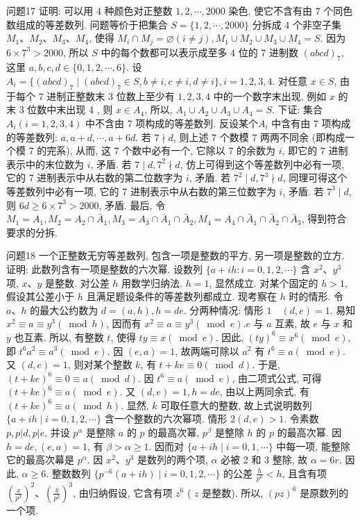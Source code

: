 问题17 证明: 可以用 4 种颜色对正整数 $1,2, \cdots, 2000$ 染色, 使它不含有由 7 个同色数组成的等差数列.
问题等价于把集合 $S=\{1,2, \cdots, 2000\}$ 分拆成 4 个非空子集 $M_1 、 M_2 、 M_3 、 M_4$, 使得 $M_i \cap M_j=\varnothing(i \neq j), M_1 \cup M_2 \cup M_3 \cup M_4=S$.
因为 $6 \times 7^3>2000$, 所以 $S$ 中的每个数都可以表示成至多 4 位的 7 进制数 $(a b c d)_7$, 这里 $a, b, c, d \in\{0,1,2, \cdots, 6\}$. 设 $A_i= \{(a b c d)_7 \mid(a b c d)_7 \in S, b \neq i, c \neq i, d \neq i\}, i=1,2,3,4$. 对任意 $x \in S$, 由于每个 7 进制正整数末 3 位数上至少有 $1,2,3,4$ 中的一个数字末出现, 例如 $x$ 的末 3 位数中末出现 4 , 则 $x \in A_4$, 所以, $A_1 \cup A_2 \cup A_3 \cup A_4=S$.
下证: 集合 $A_i(i=1,2,3,4)$ 中不含由 7 项构成的等差数列.
反设某个$A_i$ 中含有由 7 项构成的等差数列: $a, a+d, \cdots, a+6 d$. 若 $7 \nmid d$, 则上述 7 个数模 7 两两不同余 (即构成一个模 7 的完系), 从而, 这 7 个数中必有一个, 它除以 7 的余数为 $i$, 即它的 7 进制表示中的末位数为 $i$, 矛盾.
若 $7 \mid d, 7^2 \nmid d$, 仿上可得到这个等差数列中必有一项, 它的 7 进制表示中从右数的第二位数字为 $i$, 矛盾.
若 $7^2 \mid d, 7^3 \nmid d$, 同理可得这个等差数列中必有一项, 它的 7 进制表示中从右数的第三位数字为 $i$, 矛盾.
若 $7^3 \mid d$, 则 $6 d \geqslant 6 \times 7^3>2000$, 矛盾.
最后, 令 $M_1=A_1, M_2=A_2 \cap \bar{A}_1, M_3=A_3 \cap \bar{A}_1 \cap \bar{A}_2, M_4=A_4 \cap \bar{A}_1 \cap \bar{A}_2 \cap \bar{A}_3$, 得到符合要求的分拆.



问题18 一个正整数无穷等差数列, 包含一项是整数的平方, 另一项是整数的立方.
证明: 此数列含有一项是整数的六次幂.
设数列 $\{a+i h: i=0,1,2, \cdots\}$ 含 $x^2 、 y^3$ 项, $x 、 y$ 是整数.
对公差 $h$ 用数学归纳法.
$h=1$, 显然成立.
对某个固定的 $h>1$, 假设其公差小于 $h$ 且满足题设条件的等差数列都成立.
现考察在 $h$ 时的情形.
令 $a 、 h$ 的最大公约数为 $d=(a, h), h=d e$. 分两种情况:
情形 $1 \quad(d, e)=1$. 易知 $x^2 \equiv a \equiv y^3(\bmod h)$, 因而有 $x^2 \equiv a \equiv y^3(\bmod e) . e$ 与 $a$ 互素, 故 $e$ 与 $x$ 和 $y$ 也互素.
所以, 有整数 $t$, 使得 $t y \equiv x(\bmod e)$. 因此, $(t y)^6 \equiv x^6(\bmod e)$, 即 $t^6 a^2 \equiv a^3(\bmod e)$. 因 $(e, a)=1$, 故两端可除以 $a^2$ 有 $t^6 \equiv a(\bmod e)$. 又 $(d, e)=1$, 则对某个整数 $k$, 有 $t+k e \equiv 0(\bmod d)$. 于是, $(t+k e)^6 \equiv 0 \equiv a(\bmod d)$. 因 $t^6 \equiv a(\bmod e)$, 由二项式公式, 可得 $(t+k e)^6 \equiv a(\bmod e)$. 又 $(d, e)=1, h=d e$, 由以上两同余式, 有 $(t+k e)^6 \equiv a (\bmod h)$. 显然, $k$ 可取任意大的整数, 故上式说明数列 $\{a+i h \mid i=0,1,2, \cdots\}$ 含一个整数的六次幂项.
情形 $2(d, e)>1$. 令素数 $p, p|d, p| e$, 并设 $p^\alpha$ 是整除 $a$ 的 $p$ 的最高次幂, $p^\beta$ 是整除 $h$ 的 $p$ 的最高次幂.
因 $h=d e,(e, a)=1$, 有 $\beta>\alpha \geqslant 1$. 因而对 $\{a+i h \mid i=0,1, \cdots\}$ 中每一项, 能整除它的最高次幕是 $p^\alpha$. 因 $x^2 、 y^3$ 是数列的两个项, $\alpha$ 必被 2 和 3 整除, 故 $\alpha=6 r$. 因此, $\alpha \geqslant 6$. 整数数列 $\{p^{-6}(a+ i h) \mid i=0,1,2, \cdots\}$ 的公差 $\frac{h}{p^6}<h$, 且含有项 $\left(\frac{x}{p^3}\right)^2 、\left(\frac{y}{p^2}\right)^3$, 由归纳假设, 它含有项 $z^6$ ( $z$ 是整数). 所以, $(p z)^6$ 是原数列的一个项.



